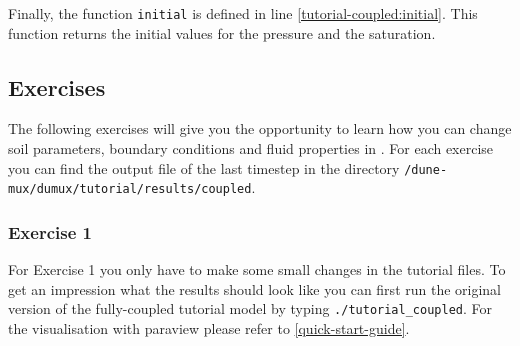 Finally, the function \texttt{initial} is defined in line \ref{tutorial-coupled:initial}. This function returns the initial values for the pressure and the
saturation.

\subsection{Exercises}
\label{tutorial-coupled:exercises}
The following exercises will give you the opportunity to learn how you can change soil parameters, boundary conditions and fluid properties in \Dumux. For each exercise you can find the output file of the last timestep in the directory \texttt{/dune-mux/dumux/tutorial/results/coupled}.

\subsubsection{Exercise 1}
\renewcommand{\labelenumi}{\alph{enumi})}
For Exercise 1 you only have to make some small changes in the tutorial files.
To get an impression what the results should look like you can first run the original version of the fully-coupled tutorial model by typing  \texttt{./tutorial\_coupled}. For the visualisation with paraview please refer to \ref{quick-start-guide}.
